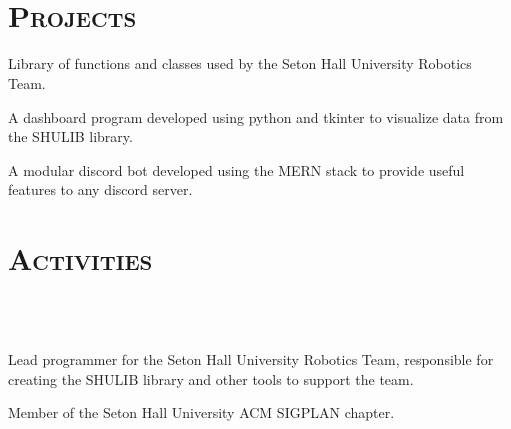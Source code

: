 \begin{resume}
\begin{formatb}
  \\
  \body\\
\end{formatb}

\section{\textsc{Projects}}

\begin{position}
Library of functions and classes used by the Seton Hall University Robotics Team.
\end{position}

\begin{position}
A dashboard program developed using python and tkinter to visualize data from the SHULIB library.
\end{position}

\begin{position}
A modular discord bot developed using the MERN stack to provide useful features to any discord server.
\end{position}



\section{\textsc{Activities}}

\begin{formatb}
  \\
  \body\\
\end{formatb}

\begin{position}
Lead programmer for the Seton Hall University Robotics Team, responsible for creating the SHULIB library and other tools to support the team.
\end{position}

\begin{position}
Member of the Seton Hall University ACM SIGPLAN chapter.
\end{position}


\end{resume}

